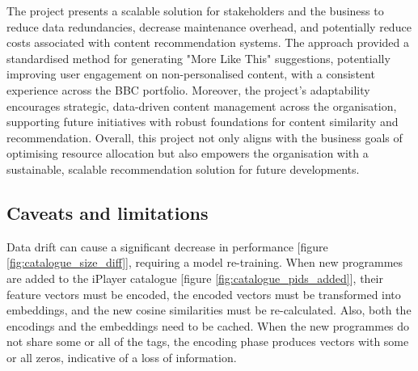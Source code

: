 The project presents a scalable solution for stakeholders and the business to reduce data redundancies,
decrease maintenance overhead, and potentially reduce costs associated with content recommendation systems.
The approach provided a standardised method for generating "More Like This" suggestions,
potentially improving user engagement on non-personalised content,
with a consistent experience across the BBC portfolio.
Moreover, the project's adaptability encourages strategic, data-driven content management across the organisation,
supporting future initiatives with robust foundations for content similarity and recommendation.
Overall, this project not only aligns with the business goals of optimising resource allocation but also empowers the organisation with a sustainable,
scalable recommendation solution for future developments.

\subsection{Caveats and limitations}

Data drift can cause a significant decrease in performance [figure \ref{fig:catalogue_size_diff}], requiring a model re-training.
When new programmes are added to the iPlayer catalogue [figure \ref{fig:catalogue_pids_added}], their feature vectors must be encoded,
the encoded vectors must be transformed into embeddings, and the new cosine similarities must be re-calculated.
Also, both the encodings and the embeddings need to be cached.
When the new programmes do not share some or all of the tags, the encoding phase produces vectors with some or all zeros,
indicative of a loss of information.
